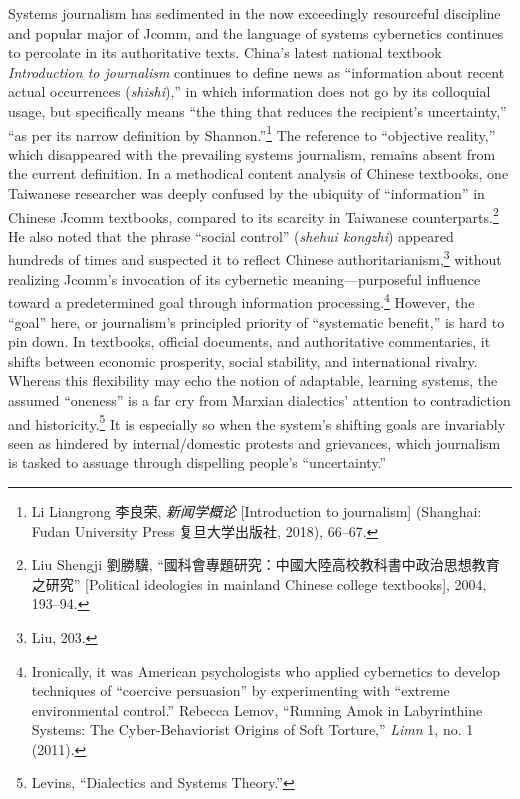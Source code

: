 \documentclass{tufte-handout}
\begin{document}
\begin{CJK*}{UTF8}{gbsn}
Systems journalism has sedimented in the now exceedingly resourceful
discipline and popular major of Jcomm, and the language of systems
cybernetics continues to percolate in its authoritative texts. China's
latest national textbook \emph{Introduction to journalism} continues to
define news as ``information about recent actual occurrences
(\emph{shishi}),'' in which information does not go by its colloquial
usage, but specifically means ``the thing that reduces the recipient's
uncertainty,'' ``as per its narrow definition by Shannon.''\footnote{Li
  Liangrong 李良荣, \emph{新闻学概论} {[}Introduction to journalism{]}
  (Shanghai: Fudan University Press 复旦大学出版社, 2018), 66--67.} The
reference to ``objective reality,'' which disappeared with the
prevailing systems journalism, remains absent from the current
definition. In a methodical content analysis of Chinese textbooks, one
Taiwanese researcher was deeply confused by the ubiquity of
``information'' in Chinese Jcomm textbooks, compared to its scarcity in
Taiwanese counterparts.\footnote{Liu Shengji 劉勝驥,
  ``國科會專題研究：中國大陸高校教科書中政治思想教育之研究''
  {[}Political ideologies in mainland Chinese college textbooks{]},
  2004, 193--94.} He also noted that the phrase ``social control''
(\emph{shehui kongzhi}) appeared hundreds of times and suspected it to
reflect Chinese authoritarianism,\footnote{Liu, 203.} without realizing
Jcomm's invocation of its cybernetic meaning---purposeful influence
toward a predetermined goal through information processing.\footnote{Ironically,
  it was American psychologists who applied cybernetics to develop
  techniques of ``coercive persuasion'' by experimenting with ``extreme
  environmental control.'' Rebecca Lemov, ``Running Amok in Labyrinthine
  Systems: The Cyber-Behaviorist Origins of Soft Torture,'' \emph{Limn}
  1, no. 1 (2011).} However, the ``goal'' here, or journalism's
principled priority of ``systematic benefit,'' is hard to pin down. In
textbooks, official documents, and authoritative commentaries, it shifts
between economic prosperity, social stability, and international
rivalry. Whereas this flexibility may echo the notion of adaptable,
learning systems, the assumed ``oneness'' is a far cry from Marxian
dialectics' attention to contradiction and historicity.\footnote{Levins,
  ``Dialectics and Systems Theory.''} It is especially so when the
system's shifting goals are invariably seen as hindered by
internal/domestic protests and grievances, which journalism is tasked to
assuage through dispelling people's ``uncertainty.''


\end{CJK*}
\end{document}
